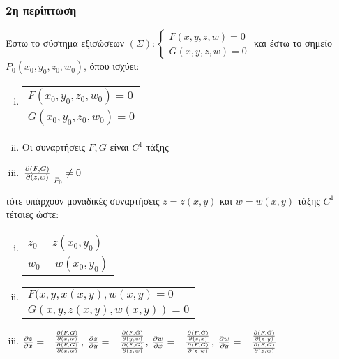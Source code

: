 \subsubsection{2η περίπτωση}

Έστω το σύστημα εξισώσεων $(\Sigma):
	\begin{cases}
		F(x,y,z,w) = 0  \\
		G(x,y,z,w) = 0
	\end{cases}$
	και έστω το σημείο $ P_0(x_0,y_0,z_0,w_0) $, όπου ισχύει:
	\begin{enumerate}[(i)]
		\item  \begin{tabular}{l}
				$F(x_0,y_0,z_0,w_0) = 0$ \\
				$G(x_0,y_0,z_0,w_0) = 0$
			\end{tabular}
		\item Οι συναρτήσεις $ F, G $ είναι $ C^{1} $ τάξης 
		\item $ \left.\pdv{(F,G)}{(z,w)}\right|_{P_0} \neq 0 $ 
	\end{enumerate}
	τότε υπάρχουν μοναδικές συναρτήσεις $ z = z(x,y) $ και $ w = w(x,y) $ τάξης $ C^{1} $ τέτοιες
	ώστε:
	\begin{enumerate}[(i)]
		\item \begin{tabular}{l}
				$ z_0 = z(x_0,y_0) $ \\
				$ w_0 = w(x_0,y_0) $
			\end{tabular}
		\item \begin{tabular}{l}
				$ F(x,y,x(x,y), w(x,y) = 0 $ \\
			$ G(x,y,z(x,y), w(x,y)) = 0 $
		\end{tabular}
	\item $ \pdv{z}{x} = - \frac{\pdv{(F,G)}{(x,w)}}{\pdv{(F,G)}{(x,w)}} $, $ \pdv{z}{y} = -
		\frac{\pdv{(F,G)}{(y,w)}}{\pdv{(F,G)}{(z,w)}} $, $ \pdv{w}{x} = -
		\frac{\pdv{(F,G)}{(z,x)}}{\pdv{(F,G)}{(z,w)}} $, $ \pdv{w}{y} = -
		\frac{\pdv{(F,G)}{(z,y)}}{\pdv{(F,G)}{(z,w)}} $
	\end{enumerate}

